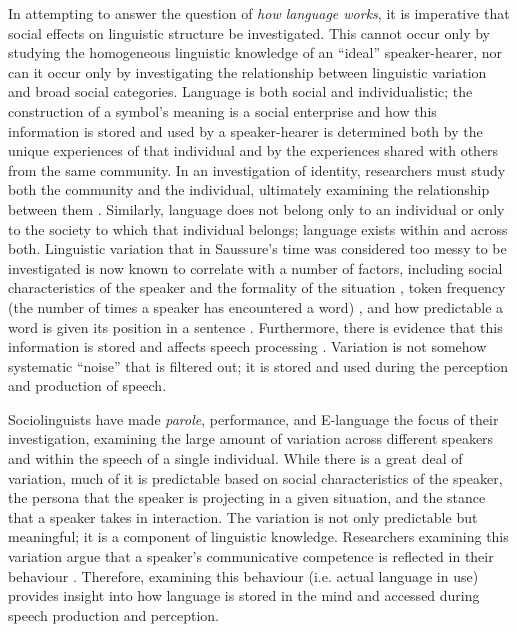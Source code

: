 In attempting to answer the question of \textit{how language works}, it is imperative that social effects on linguistic structure be investigated.  This cannot occur only by studying the homogeneous linguistic knowledge of an ``ideal'' speaker-hearer, nor can it occur only by investigating the relationship between linguistic variation and broad social categories.  Language is both social and individualistic; the construction of a symbol's meaning is a social enterprise and how this information is stored and used by a speaker-hearer is determined both by the unique experiences of that individual and by the experiences shared with others from the same community.  In an investigation of identity, researchers must study both the community and the individual, ultimately examining the relationship between them \cite[146]{wenger1998}.  Similarly, language does not belong only to an individual or only to the society to which that individual belongs; language exists within and across both.  Linguistic variation that in Saussure's time was considered too messy to be investigated is now known to correlate with a number of factors, including social characteristics of the speaker and the formality of the situation \cite{labov1972sociolingpatterns}, token frequency (the number of times a speaker has encountered a word) \cite{bybee2002}, and  how predictable a word is given its position in a sentence \cite{jurafskyetal2002}. Furthermore, there is evidence that this information is stored and affects speech processing \cite{strand1999,jurafsky2003}.  Variation is not somehow systematic ``noise'' that is filtered out; it is stored and used during the perception and production of speech.

Sociolinguists have made \textit{parole}, performance, and E-language the focus of their investigation, examining the large amount of variation across different speakers and within the speech of a single individual.  While there is a great deal of variation, much of it is predictable based on social characteristics of the speaker, the persona that the speaker is projecting in a given situation, and the stance that a speaker takes in interaction.  The variation is not only predictable but meaningful; it is a component of linguistic knowledge.  Researchers examining this variation argue that a speaker's communicative competence is reflected in their behaviour \cite{hymes1972}.  Therefore, examining this behaviour (i.e. actual language in use) provides insight into how language is stored in the mind and accessed during speech production and perception.  

